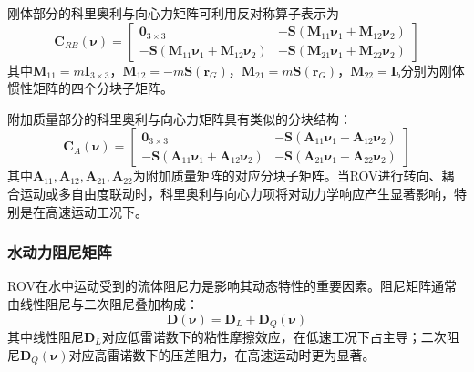刚体部分的科里奥利与向心力矩阵可利用反对称算子表示为
\begin{equation}
    \boldsymbol{C}_{RB}(\boldsymbol{\nu})=
    \begin{bmatrix}
        \boldsymbol{0}_{3\times3} & -\boldsymbol{S}(\boldsymbol{M}_{11}\boldsymbol{\nu}_1+\boldsymbol{M}_{12}\boldsymbol{\nu}_2) \\
        -\boldsymbol{S}(\boldsymbol{M}_{11}\boldsymbol{\nu}_1+\boldsymbol{M}_{12}\boldsymbol{\nu}_2) & -\boldsymbol{S}(\boldsymbol{M}_{21}\boldsymbol{\nu}_1+\boldsymbol{M}_{22}\boldsymbol{\nu}_2)
    \end{bmatrix}
    \label{eq:C_RB}
\end{equation}
其中$\boldsymbol{M}_{11}=m\boldsymbol{I}_{3\times3}$，$\boldsymbol{M}_{12}=-m\boldsymbol{S}(\boldsymbol{r}_G)$，$\boldsymbol{M}_{21}=m\boldsymbol{S}(\boldsymbol{r}_G)$，$\boldsymbol{M}_{22}=\boldsymbol{I}_b$分别为刚体惯性矩阵的四个分块子矩阵。

附加质量部分的科里奥利与向心力矩阵具有类似的分块结构：
\begin{equation}
    \boldsymbol{C}_{A}(\boldsymbol{\nu})=
    \begin{bmatrix}
        \boldsymbol{0}_{3\times3} & -\boldsymbol{S}(\boldsymbol{A}_{11}\boldsymbol{\nu}_1+\boldsymbol{A}_{12}\boldsymbol{\nu}_2) \\
        -\boldsymbol{S}(\boldsymbol{A}_{11}\boldsymbol{\nu}_1+\boldsymbol{A}_{12}\boldsymbol{\nu}_2) & -\boldsymbol{S}(\boldsymbol{A}_{21}\boldsymbol{\nu}_1+\boldsymbol{A}_{22}\boldsymbol{\nu}_2)
    \end{bmatrix}
    \label{eq:C_A}
\end{equation}
其中$\boldsymbol{A}_{11},\boldsymbol{A}_{12},\boldsymbol{A}_{21},\boldsymbol{A}_{22}$为附加质量矩阵的对应分块子矩阵。当ROV进行转向、耦合运动或多自由度联动时，科里奥利与向心力项将对动力学响应产生显著影响，特别是在高速运动工况下。

\subsubsection{水动力阻尼矩阵}

ROV在水中运动受到的流体阻尼力是影响其动态特性的重要因素。阻尼矩阵通常由线性阻尼与二次阻尼叠加构成：
\begin{equation}
    \boldsymbol{D}(\boldsymbol{\nu})
    =
    \boldsymbol{D}_{L}
    +
    \boldsymbol{D}_{Q}(\boldsymbol{\nu})
\end{equation}
其中线性阻尼$\boldsymbol{D}_{L}$对应低雷诺数下的粘性摩擦效应，在低速工况下占主导；二次阻尼$\boldsymbol{D}_{Q}(\boldsymbol{\nu})$对应高雷诺数下的压差阻力，在高速运动时更为显著。

